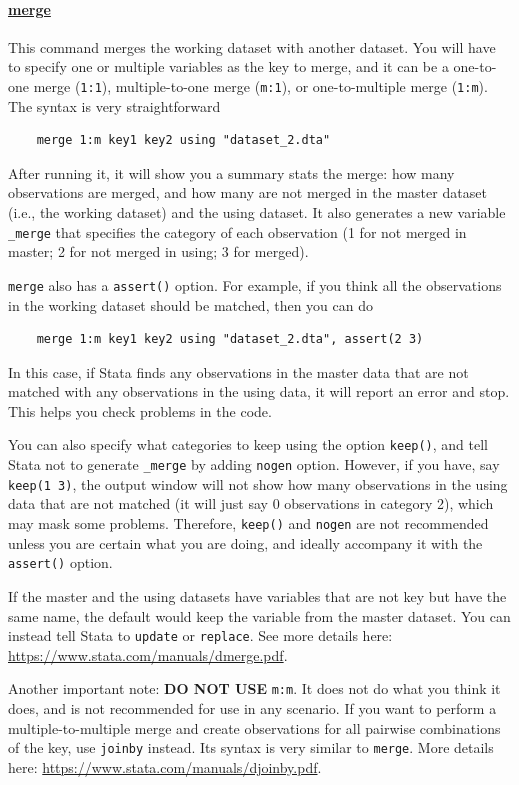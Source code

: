 \paragraph{\underline{merge}} This command merges the working dataset with another dataset. You will have to specify one or multiple variables as the key to merge, and it can be a one-to-one merge (\verb|1:1|), multiple-to-one merge (\verb|m:1|), or one-to-multiple merge (\verb|1:m|). The syntax is very straightforward
\begin{verbatim}
    merge 1:m key1 key2 using "dataset_2.dta"
\end{verbatim}
After running it, it will show you a summary stats the merge: how many observations are merged, and how many are not merged in the master dataset (i.e., the working dataset) and the using dataset. It also generates a new variable \verb|_merge| that specifies the category of each observation (1 for not merged in master; 2 for not merged in using; 3 for merged). 

\verb|merge| also has a \verb|assert()| option. For example, if you think all the observations in the working dataset should be matched, then you can do 
\begin{verbatim}
    merge 1:m key1 key2 using "dataset_2.dta", assert(2 3)
\end{verbatim}
In this case, if Stata finds any observations in the master data that are not matched with any observations in the using data, it will report an error and stop. This helps you check problems in the code. 

You can also specify what categories to keep using the option \verb|keep()|, and tell Stata not to generate \verb|_merge| by adding \verb|nogen| option. However, if you have, say \verb|keep(1 3)|, the output window will not show how many observations in the using data that are not matched (it will just say 0 observations in category 2), which may mask some problems. Therefore, \verb|keep()| and \verb|nogen| are not recommended unless you are certain what you are doing, and ideally accompany it with the \verb|assert()| option. 

If the master and the using datasets have variables that are not key but have the same name, the default would keep the variable from the master dataset. You can instead tell Stata to \verb|update| or \verb|replace|. See more details here: \url{https://www.stata.com/manuals/dmerge.pdf}.

Another important note: \textbf{DO NOT USE} \verb|m:m|. It does not do what you think it does, and is not recommended for use in any scenario. If you want to perform a multiple-to-multiple merge and create observations for all pairwise combinations of the key, use \verb|joinby| instead. Its syntax is very similar to \verb|merge|. More details here: \url{https://www.stata.com/manuals/djoinby.pdf}.

